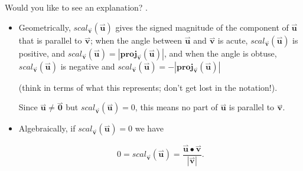 \documentclass{ximera}
\begin{document}
\begin{exercise}
\begin{selectAll}
\begin{hint}
\begin{problem}
Would you like to see an explanation?
.

\begin{question}
\begin{itemize}
\item Geometrically, $scal_\overset{\boldsymbol{\rightharpoonup}}{\mathbf{v}}(\overset{\boldsymbol{\rightharpoonup}}{\mathbf{u}})$ gives the signed magnitude of the component of $\overset{\boldsymbol{\rightharpoonup}}{\mathbf{u}}$ that is parallel to $\overset{\boldsymbol{\rightharpoonup}}{\mathbf{v}}$; when the angle between $\overset{\boldsymbol{\rightharpoonup}}{\mathbf{u}}$ and $\overset{\boldsymbol{\rightharpoonup}}{\mathbf{v}}$ is acute, $scal_\overset{\boldsymbol{\rightharpoonup}}{\mathbf{v}}(\overset{\boldsymbol{\rightharpoonup}}{\mathbf{u}})$ is positive, and $scal_\overset{\boldsymbol{\rightharpoonup}}{\mathbf{v}}(\overset{\boldsymbol{\rightharpoonup}}{\mathbf{u}}) = |\mathbf{proj}_{\overset{\boldsymbol{\rightharpoonup}}{\mathbf{v}}}(\overset{\boldsymbol{\rightharpoonup}}{\mathbf{u}})|$, and when the angle is obtuse, $scal_\overset{\boldsymbol{\rightharpoonup}}{\mathbf{v}}(\overset{\boldsymbol{\rightharpoonup}}{\mathbf{u}})$  is negative and $scal_\overset{\boldsymbol{\rightharpoonup}}{\mathbf{v}}(\overset{\boldsymbol{\rightharpoonup}}{\mathbf{u}}) = -|\mathbf{proj}_{\overset{\boldsymbol{\rightharpoonup}}{\mathbf{v}}}(\overset{\boldsymbol{\rightharpoonup}}{\mathbf{u}})|$ 

(think in terms of what this represents; don't get lost in the notation!).

Since $\overset{\boldsymbol{\rightharpoonup}}{\mathbf{u}} \neq \overset{\boldsymbol{\rightharpoonup}}{\mathbf{0}}$ but $scal_\overset{\boldsymbol{\rightharpoonup}}{\mathbf{v}}(\overset{\boldsymbol{\rightharpoonup}}{\mathbf{u}}) =0$, this means no part of $\overset{\boldsymbol{\rightharpoonup}}{\mathbf{u}}$ is parallel to $\overset{\boldsymbol{\rightharpoonup}}{\mathbf{v}}$.

\item Algebraically, if $scal_\overset{\boldsymbol{\rightharpoonup}}{\mathbf{v}}(\overset{\boldsymbol{\rightharpoonup}}{\mathbf{u}}) =0$ we have

\[
0 = scal_\overset{\boldsymbol{\rightharpoonup}}{\mathbf{v}}(\overset{\boldsymbol{\rightharpoonup}}{\mathbf{u}}) = \frac{\overset{\boldsymbol{\rightharpoonup}}{\mathbf{u}} \bullet \overset{\boldsymbol{\rightharpoonup}}{\mathbf{v}}}{|\overset{\boldsymbol{\rightharpoonup}}{\mathbf{v}}|}.
\]


\end{itemize}
\end{question}
\end{problem}
\end{hint}
\end{selectAll}
\end{exercise}
\end{document}
